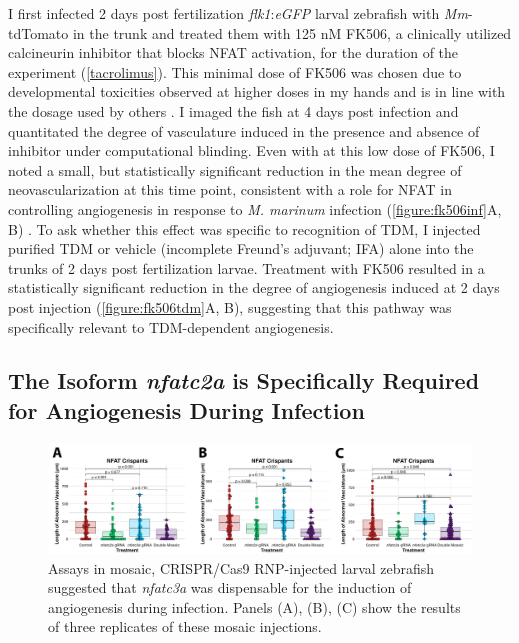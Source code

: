 I first infected 2 days post fertilization \textit{flk1}:\textit{eGFP} larval zebrafish with \textit{Mm}\hyp{}tdTomato in the trunk and treated them with 125 nM FK506, a clinically utilized calcineurin inhibitor that blocks NFAT activation, for the duration of the experiment \citep{Ellis1995} (\autoref{tacrolimus}). This minimal dose of FK506 was chosen due to developmental toxicities observed at higher doses in my hands and is in line with the dosage used by others \citep{Kujawski2014}. I imaged the fish at 4 days post infection and quantitated the degree of vasculature induced in the presence and absence of inhibitor under computational blinding. Even with at this low dose of FK506, I noted a small, but statistically significant reduction in the mean degree of neovascularization at this time point, consistent with a role for NFAT in controlling angiogenesis in response to \textit{M. marinum} infection (\autoref{figure:fk506inf}A, B) \citep{Kujawski2014}. To ask whether this effect was specific to recognition of TDM, I injected purified TDM or vehicle (incomplete Freund's adjuvant; IFA) alone into the trunks of 2 days post fertilization larvae. Treatment with FK506 resulted in a statistically significant reduction in the degree of angiogenesis induced at 2 days post injection (\autoref{figure:fk506tdm}A, B), suggesting that this pathway was specifically relevant to TDM\hyp{}dependent angiogenesis.

\subsection{The Isoform \textit{nfatc2a} is Specifically Required for Angiogenesis During Infection}

\begin{figure}
\centering
\includegraphics[width=\textwidth]{images/mosaicnfatc3a.pdf}
\caption[\textit{nfatc3a} is dispensable for angiogenesis]{Assays in mosaic, CRISPR/Cas9 RNP\hyp{}injected larval zebrafish suggested that \textit{nfatc3a} was dispensable for the induction of angiogenesis during infection. Panels (A), (B), (C) show the results of three replicates of these mosaic injections.}
\label{figure:mosaic}
\end{figure}

